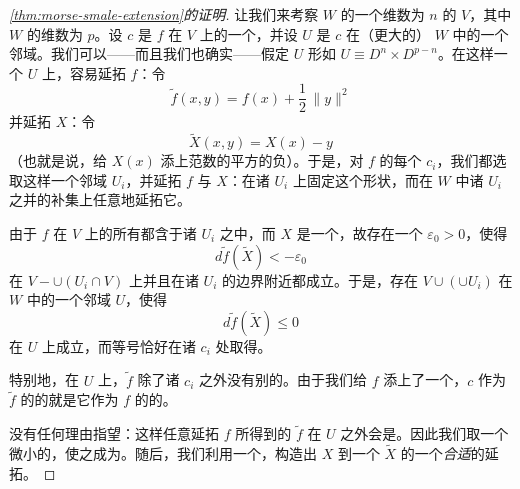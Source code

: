 \begin{proof}[\cref{thm:morse-smale-extension}的证明]
让我们来考察\trManifold{} $W$ 的一个维数为 $n$ 的\trSubmanifold{} $V$，其中 $W$ 的维数为 $p$。设 $c$ 是 $f$ 在 $V$ 上的一个\trCriticalPoint，并设 $U$ 是 $c$ 在（更大的）\trManifold{} $W$ 中的一个邻域。我们可以——而且我们也确实——假定 $U$ 形如 $U\equiv D^n\times D^{p-n}$。在这样一个 $U$ 上，容易延拓 $f$：令
\[
\widetilde f(x,y)=f(x)+\frac{1}{2}\,\|y\|^2
\]
并延拓 $X$：令
\[
\widetilde X(x,y)=X(x)-y
\]
（也就是说，给 $X(x)$ 添上范数的平方的负\trGradient）。于是，对 $f$ 的每个\trCriticalPoint{} $c_i$，我们都选取这样一个邻域 $U_i$，并延拓 $f$ 与 $X$：在诸 $U_i$ 上固定这个形状，而在 $W$ 中诸 $U_i$ 之并的补集上任意地延拓它。

\setcounter{figure}{2}%
\begin{figure}[htbp]
\centering
{}
\caption{}
\label{fig:critical-neighborhoods-extension}
\end{figure}

由于 $f$ 在 $V$ 上的所有\trCriticalPoint{}都含于诸 $U_i$ 之中，而 $X$ 是一个\trPseudogradient，故存在一个 $\varepsilon_0>0$，使得
\[
d\widetilde f(\widetilde X)<-\varepsilon_0
\]
在 $V-\cup(U_i\cap V)$ 上并且在诸 $U_i$ 的边界附近都成立。于是，存在 $V\cup(\cup U_i)$ 在 $W$ 中的一个\trOpen{}邻域 $U$，使得
\[
d\widetilde f(\widetilde X)\le 0
\]
在 $U$ 上成立，而等号恰好在诸 $c_i$ 处取得。

特别地，在 $U$ 上，$\widetilde f$ 除了诸 $c_i$ 之外没有别的\trCriticalPoint。由于我们给 $f$ 添上了一个\trPositiveDefinite\trQuadraticForm，$c$ 作为 $\widetilde f$ 的\trCriticalPoint{}的\trIndex{}就是它作为 $f$ 的\trCriticalPoint{}的\trIndex。

没有任何理由指望：这样任意延拓 $f$ 所得到的 $\widetilde f$ 在 $U$ 之外会是\trMorseFunction。因此我们取一个微小的\trPerturbation，使之成为\trMorseFunction。随后，我们利用一个\trPartitionOfUnity，构造出 $X$ 到一个\trPseudogradient{} $\widetilde X$ 的一个\emph{合适}的延拓。


\end{proof}

